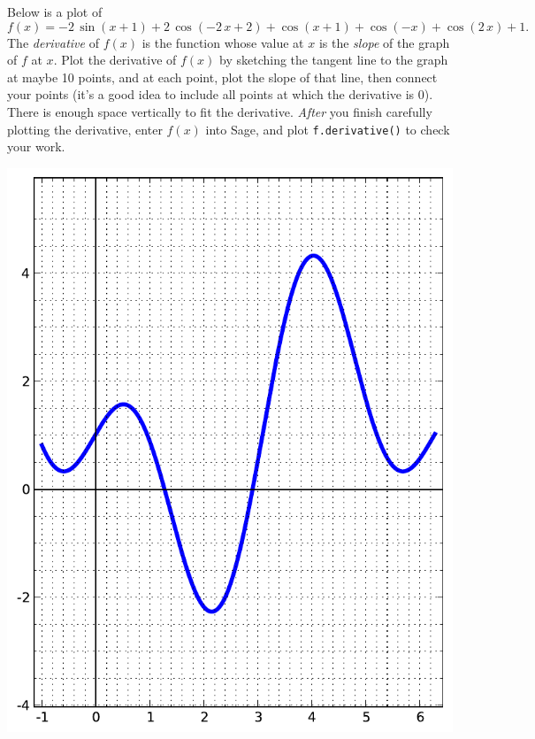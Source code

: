 Below is a plot of $$f(x)=-2 \, \sin\left(x + 1\right) + 2 \, \cos\left(-2 \, x + 2\right) + \cos\left(x + 1\right) + \cos\left(-x\right) + \cos\left(2 \, x\right) + 1.$$  The {\em \color{red}derivative} of $f(x)$ is the function whose value at $x$ is the {\em slope} of the graph of $f$ at $x$.  Plot the derivative of $f(x)$ by sketching the tangent line to the graph at maybe 10 points, and at each point, plot the slope of that line, then connect your points (it's a good idea to include all points at which the derivative is 0).  There is enough space vertically to fit the derivative.  {\em After} you finish carefully plotting the derivative, enter $f(x)$ into Sage, and plot {\color{blue}\verb|f.derivative()|} to check your work.
\begin{center}\includegraphics{functions/33.pdf}\end{center}\newpage

